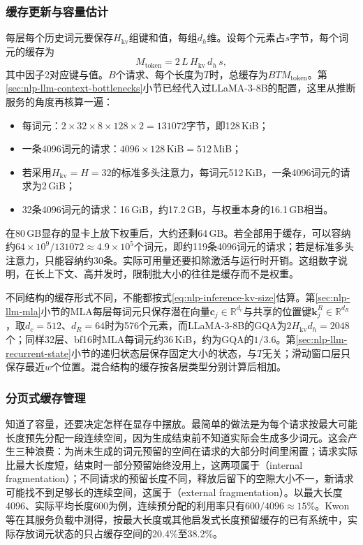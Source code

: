 \subsubsection{缓存更新与容量估计}
\label{sec:nlp-inference-cache-size}

每层每个历史词元要保存$H_{\mathrm{kv}}$组键和值，每组$d_h$维。设每个元素占$s$字节，每个词元的缓存为
\begin{equation}
 M_{\mathrm{token}}=2\,L\,H_{\mathrm{kv}}\,d_h\,s,
 \label{eq:nlp-inference-kv-size}
\end{equation}
其中因子2对应键与值。$B$个请求、每个长度为$T$时，总缓存为$BTM_{\mathrm{token}}$。第\ref{sec:nlp-llm-context-bottlenecks}小节已经代入过LLaMA-3-8B的配置，这里从推断服务的角度再核算一遍：
\begin{itemize}
  \item 每词元：$2\times32\times8\times128\times2=131072$字节，即128\,KiB；
  \item 一条4096词元的请求：$4096\times128\,\mathrm{KiB}=512$\,MiB；
  \item 若采用$H_{\mathrm{kv}}=H=32$的标准多头注意力，每词元512\,KiB，一条4096词元的请求为2\,GiB；
  \item 32条4096词元的请求：16\,GiB，约17.2\,GB，与权重本身的16.1\,GB相当。
\end{itemize}
在80\,GB显存的显卡上放下权重后，大约还剩64\,GB。若全部用于缓存，可以容纳约$64\times10^9/131072\approx4.9\times10^5$个词元，即约119条4096词元的请求；若是标准多头注意力，只能容纳约30条。实际可用量还要扣除激活与运行时开销。这组数字说明，在长上下文、高并发时，限制批大小的往往是缓存而不是权重。

不同结构的缓存形式不同，不能都按式\eqref{eq:nlp-inference-kv-size}估算。第\ref{sec:nlp-llm-mla}小节的MLA每层每词元只保存潜在向量$\bm c_j\in\mathbb R^{d_c}$与共享的位置键$\bm k_j^R\in\mathbb R^{d_R}$，取$d_c=512$、$d_R=64$时为576个元素，而LLaMA-3-8B的GQA为$2H_{\mathrm{kv}}d_h=2048$个；同样32层、bf16时MLA每词元约36\,KiB，约为GQA的$1/3.6$。第\ref{sec:nlp-llm-recurrent-state}小节的递归状态层保存固定大小的状态，与$T$无关；滑动窗口层只保存最近$w$个位置。混合结构的缓存按各层类型分别计算后相加。

\subsubsection{分页式缓存管理}
\label{sec:nlp-inference-paged}

知道了容量，还要决定怎样在显存中摆放。最简单的做法是为每个请求按最大可能长度预先分配一段连续空间，因为生成结束前不知道实际会生成多少词元。这会产生三种浪费：为尚未生成的词元预留的空间在请求的大部分时间里闲置；请求实际比最大长度短，结束时一部分预留始终没用上，这两项属于（internal fragmentation）；不同请求的预留长度不同，释放后留下的空隙大小不一，新请求可能找不到足够长的连续空间，这属于（external fragmentation）。以最大长度4096、实际平均长度600为例，连续预分配的利用率只有$600/4096\approx15\%$。Kwon等在其服务负载中测得，按最大长度或其他启发式长度预留缓存的已有系统中，实际存放词元状态的只占缓存空间的20.4\%至38.2\%。

